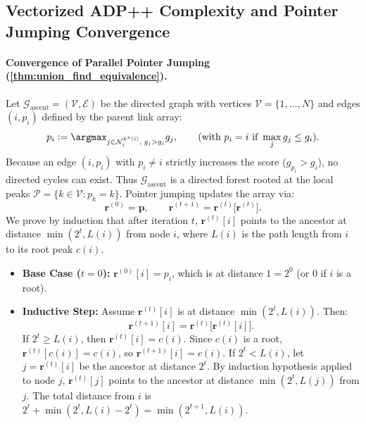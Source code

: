 \subsection{Vectorized ADP++ Complexity and Pointer Jumping Convergence}
\label{subsec:supp_adppp_vectorized}

\paragraph{Convergence of Parallel Pointer Jumping
(\cref{thm:union_find_equivalence}).}
Let $\mathcal{G}_{\mathrm{ascent}} = (\mathcal{V}, \mathcal{E})$ be
the directed graph
with vertices $\mathcal{V} = \{1, \dots, N\}$ and edges $(i, p_i)$
defined by the parent link array:
\begin{equation}
  p_i \coloneqq \argmax_{j \in \mathcal{N}_i^{\kstar(i)},\; g_j >
  g_i} g_j, \qquad (\text{with } p_i = i \text{ if } \max_{j} g_j \le g_i).
\end{equation}
Because an edge $(i, p_i)$ with $p_i \ne i$ strictly increases the
score ($g_{p_i} > g_i$),
no directed cycles can exist. Thus $\mathcal{G}_{\mathrm{ascent}}$
is a directed forest
rooted at the local peaks $\mathcal{P} = \{k \in \mathcal{V} : p_k = k\}$.
Pointer jumping updates the array via:
\begin{equation}
  \mathbf{r}^{(0)} = \mathbf{p}, \qquad \mathbf{r}^{(t+1)} =
  \mathbf{r}^{(t)}\bigl[\mathbf{r}^{(t)}\bigr].
\end{equation}
We prove by induction that after iteration $t$,
$\mathbf{r}^{(t)}[i]$ points to the ancestor
at distance $\min(2^t, L(i))$ from node $i$, where $L(i)$ is the
path length from $i$ to its root peak $c(i)$.
\begin{itemize}
  \item \textbf{Base Case ($t = 0$):} $\mathbf{r}^{(0)}[i] = p_i$,
    which is at distance $1 = 2^0$ (or $0$ if $i$ is a root).
  \item \textbf{Inductive Step:} Assume $\mathbf{r}^{(t)}[i]$ is at
    distance $\min(2^t, L(i))$. Then:
    \begin{equation}
      \mathbf{r}^{(t+1)}[i] = \mathbf{r}^{(t)}\bigl[\mathbf{r}^{(t)}[i]\bigr].
    \end{equation}
    If $2^t \ge L(i)$, then $\mathbf{r}^{(t)}[i] = c(i)$. Since
    $c(i)$ is a root, $\mathbf{r}^{(t)}[c(i)] = c(i)$, so
    $\mathbf{r}^{(t+1)}[i] = c(i)$.
    If $2^t < L(i)$, let $j = \mathbf{r}^{(t)}[i]$ be the ancestor
    at distance $2^t$.
    By induction hypothesis applied to node $j$,
    $\mathbf{r}^{(t)}[j]$ points to the ancestor at distance
    $\min(2^t, L(j))$ from $j$.
    The total distance from $i$ is $2^t + \min(2^t, L(i) - 2^t) =
    \min(2^{t+1}, L(i))$.
\end{itemize}

